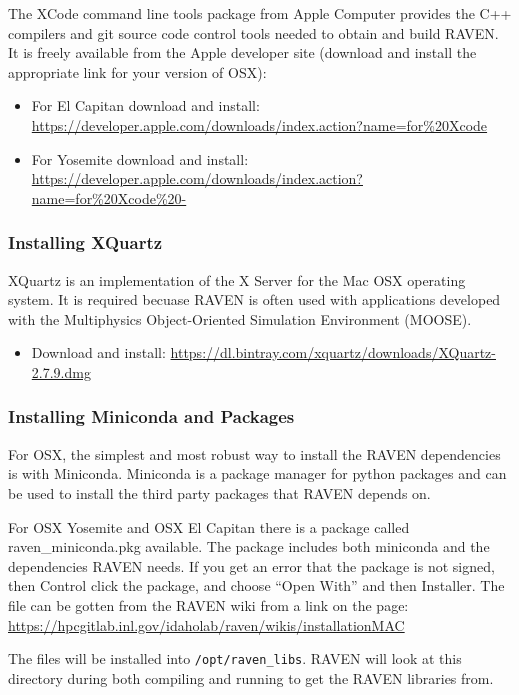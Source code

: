The XCode command line tools package from Apple Computer provides the C++
compilers and git source code control tools needed to obtain and build RAVEN.
It is freely available from the Apple developer site (download and install the appropriate link
for your version of OSX):
\begin{itemize}
    \item For El Capitan download and install: \url{https://developer.apple.com/downloads/index.action?name=for%20Xcode}
    \item For Yosemite download and install:  \url{https://developer.apple.com/downloads/index.action?name=for%20Xcode%20-}
\end{itemize}

\subsubsection{Installing XQuartz}
XQuartz is an implementation of the X Server for the Mac OSX operating system.  It is required
becuase RAVEN is often used with applications developed with the Multiphysics
Object-Oriented Simulation Environment (MOOSE).
\begin{itemize}
    \item Download and install: \url{https://dl.bintray.com/xquartz/downloads/XQuartz-2.7.9.dmg}
\end{itemize}

\subsubsection{Installing Miniconda and Packages}
\label{miniconda}

For OSX, the simplest and most robust way to install the RAVEN
dependencies is with Miniconda.  Miniconda is a package manager for
python packages and can be used to install the third party packages
that RAVEN depends on.

For OSX Yosemite and OSX El Capitan there is a package called
raven\_miniconda.pkg available.  The package includes both miniconda
and the dependencies RAVEN needs. If you get an error that the package
is not signed, then Control click the package, and choose ``Open
With'' and then Installer.  The file can be gotten from the RAVEN wiki
from a link on the page:
\url{https://hpcgitlab.inl.gov/idaholab/raven/wikis/installationMAC}

The files will be installed into \texttt{/opt/raven\_libs}.  RAVEN
will look at this directory during both compiling and running to get
the RAVEN libraries from.

